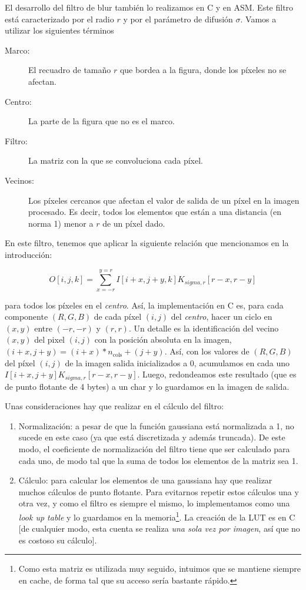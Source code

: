 El desarrollo del filtro de {\ttfamily blur} también lo realizamos en
C y en ASM. Este filtro está caracterizado por el radio $r$ y por el
parámetro de difusión $\sigma$. Vamos a utilizar los siguientes
términos

\begin{description}
\item[Marco:] El recuadro de tamaño $r$ que bordea a la figura, donde
  los píxeles no se afectan.
\item[Centro:] La parte de la figura que no es el marco.
\item[Filtro:] La matriz con la que se convoluciona cada píxel.
\item[Vecinos:] Los píxeles cercanos que afectan el valor de salida de
  un píxel en la imagen procesado. Es decir, todos los elementos que
  están a una distancia (en norma 1) menor a $r$ de un píxel dado.
\end{description}

En este filtro, tenemos que aplicar la siguiente relación que
mencionamos en la introducción:

\begin{equation}
  O[i, j, k] = \sum_{x=-r}^{y=r} I[i+x, j+y, k] K_{sigma, r} [r-x, r-y]
  \label{eq:blur}
\end{equation}

para todos los píxeles en el \emph{centro}. Así, la implementación en
C es, para cada componente $(R, G, B)$ de cada píxel $(i, j)$ del
\emph{centro}, hacer un ciclo en $(x, y)$ entre $(-r, -r)$ y $(r,r)$.
Un detalle es la identificación del vecino $(x, y)$ del pixel $(i, j)$
con la posición absoluta en la imagen,
$(i + x, j + y) = (i + x)*n_{\text{cols}} + (j + y)$. Así, con los
valores de $(R, G, B)$ del píxel $(i, j)$ de la imagen salida
inicializados a 0, acumulamos en cada uno
$ I[i+x, j+y] K_{sigma, r} [r-x, r-y]$. Luego, redondeamos este
resultado (que es de punto flotante de 4 bytes) a un char y lo
guardamos en la imagen de salida.

Unas consideraciones hay que realizar en el cálculo del filtro:

\begin{enumerate}
\item Normalización: a pesar de que la función gaussiana está
  normalizada a 1, no sucede en este caso (ya que está discretizada y
  además truncada). De este modo, el coeficiente de normalización del
  filtro tiene que ser calculado para cada uno, de modo tal que la
  suma de todos los elementos de la matriz sea 1.

\item Cálculo: para calcular los elementos de una gaussiana hay que
  realizar muchos cálculos de punto flotante. Para evitarnos repetir
  estos cálculos una y otra vez, y como el filtro es siempre el mismo,
  lo implementamos como una \emph{look up table} y lo guardamos en la
  memoria\footnote{Como esta matriz es utilizada muy seguido, intuimos
    que se mantiene siempre en cache, de forma tal que su acceso sería
    bastante rápido.}. La creación de la LUT es en C [de cualquier
  modo, esta cuenta se realiza \emph{una sola vez por imagen}, así que
  no es costoso su cálculo].
\end{enumerate}

